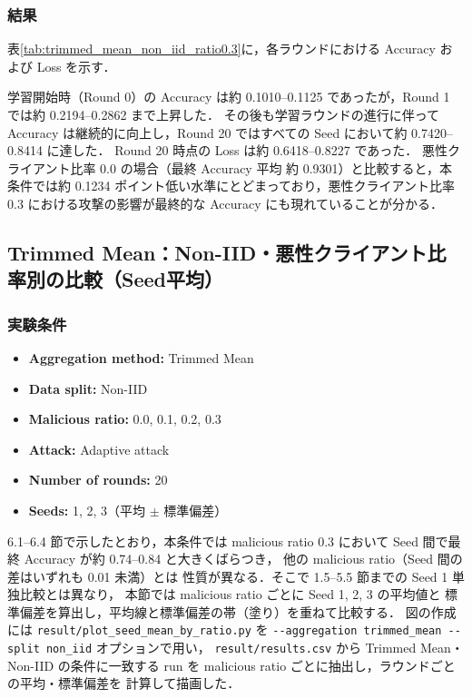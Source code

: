 \documentclass[a4j,twocolumn,dvipdfmx]{jsarticle}
\begin{document}
\subsubsection{結果}

表\ref{tab:trimmed_mean_non_iid_ratio0.3}に，各ラウンドにおける
Accuracy および Loss を示す．

学習開始時（Round 0）の Accuracy は約 0.1010--0.1125 であったが，Round 1 では約 0.2194--0.2862 まで上昇した． その後も学習ラウンドの進行に伴って Accuracy は継続的に向上し，Round 20 ではすべての Seed において約 0.7420--0.8414 に達した． Round 20 時点の Loss は約 0.6418--0.8227 であった． 悪性クライアント比率 0.0 の場合（最終 Accuracy 平均 約 0.9301）と比較すると，本条件では約 0.1234 ポイント低い水準にとどまっており，悪性クライアント比率 0.3 における攻撃の影響が最終的な Accuracy にも現れていることが分かる．

\clearpage
\subsection{Trimmed Mean：Non-IID・悪性クライアント比率別の比較（Seed平均）}

\subsubsection{実験条件}

\begin{itemize}
    \item \textbf{Aggregation method:} Trimmed Mean
    \item \textbf{Data split:} Non-IID
    \item \textbf{Malicious ratio:} 0.0, 0.1, 0.2, 0.3
    \item \textbf{Attack:} Adaptive attack
    \item \textbf{Number of rounds:} 20
    \item \textbf{Seeds:} 1, 2, 3（平均 $\pm$ 標準偏差）
\end{itemize}

6.1--6.4 節で示したとおり，本条件では malicious ratio 0.3 において
Seed 間で最終 Accuracy が約 0.74--0.84 と大きくばらつき，
他の malicious ratio（Seed 間の差はいずれも 0.01 未満）とは
性質が異なる．そこで 1.5--5.5 節までの Seed 1 単独比較とは異なり，
本節では malicious ratio ごとに Seed 1, 2, 3 の平均値と
標準偏差を算出し，平均線と標準偏差の帯（塗り）を重ねて比較する．
図の作成には \verb|result/plot_seed_mean_by_ratio.py| を
\verb|--aggregation trimmed_mean --split non_iid| オプションで用い，
\verb|result/results.csv| から Trimmed Mean・Non-IID の条件に一致する
run を malicious ratio ごとに抽出し，ラウンドごとの平均・標準偏差を
計算して描画した．
\end{document}
